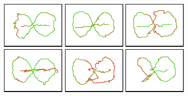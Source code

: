\documentclass{svmult}
\begin{document}
\begin{figure}
\includegraphics[width=.15\textwidth]{breugel_babel-traj} \hfill
\includegraphics[width=.15\textwidth]{van-gogh_starry-night-traj} \hfill
\includegraphics[width=.15\textwidth]{kandinsky_comp-8-traj} \hfill
\includegraphics[width=.15\textwidth]{vermeer_girl-pearl-traj} \hfill
\includegraphics[width=.15\textwidth]{babar-traj} \hfill
\includegraphics[width=.15\textwidth]{child-drawing_tooth-fairy-traj}

\vspace{.7em}


\end{figure}
\end{document}
